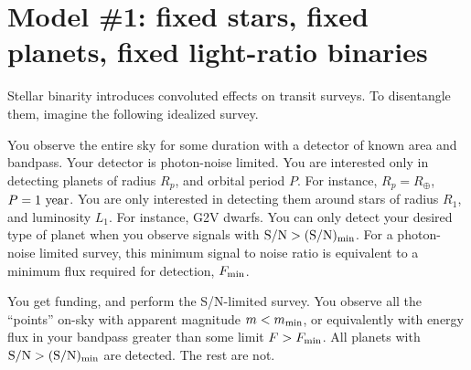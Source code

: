 \documentclass{emulateapj}
\begin{document}
\section{Model \#1: fixed stars, fixed planets, fixed light-ratio binaries}
\label{sec:model_1}

Stellar binarity introduces convoluted effects on transit surveys.
To disentangle them, imagine the following idealized survey.

You observe the entire sky for some duration with a detector of known 
area and bandpass. Your detector is photon-noise limited.
You are interested only in detecting planets of radius $R_p$, and orbital 
period $P$. For instance, $R_p=R_\oplus$, $P={\rm 1\ year}$.
You are only interested in detecting them around stars of radius $R_1$, 
and luminosity $L_1$. For instance, G2V dwarfs.
You can only detect your desired type of planet when you observe signals 
with ${\rm S/N} > {\rm (S/N)_{min}}$.
For a photon-noise limited survey, this minimum signal to noise ratio is 
equivalent to a minimum flux required for detection, $F_{\rm min}$.

You get funding, and perform the S/N-limited survey. 
You observe all the ``points'' on-sky with apparent 
magnitude $m < m_{\rm min}$, or equivalently with energy flux in your bandpass 
greater than some limit $F > F_{\rm min}$.
All planets with ${\rm S/N} > {\rm (S/N)_{min}}$ are detected. The rest are 
not.
\end{document}
